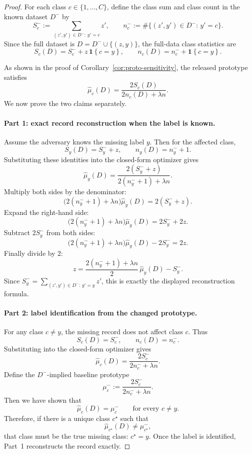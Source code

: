 \documentclass[conference,compsoc]{IEEEtran}
\newcommand{\ind}[1]{\mathbf{1}\!\left\{#1\right\}}
\begin{document}
\begin{proof}
For each class $c\in\{1,\dots,C\}$, define the class sum and class count in the known dataset $D^-$ by
\[
S_c^-:=\sum_{(z',y')\in D^-:\,y'=c} z',
\qquad
n_c^-:=\#\{(z',y')\in D^-:\,y'=c\}.
\]
Since the full dataset is $D=D^-\cup\{(z,y)\}$, the full-data class statistics are
\[
S_c(D)=S_c^-+z\,\ind{c=y},
\qquad
n_c(D)=n_c^-+\ind{c=y}.
\]

As shown in the proof of Corollary~\ref{cor:proto-sensitivity}, the released prototype satisfies
\[
\widehat\mu_c(D)=\frac{2S_c(D)}{2n_c(D)+\lambda n}.
\]
We now prove the two claims separately.

\paragraph{Part 1: exact record reconstruction when the label is known.}
Assume the adversary knows the missing label $y$. Then for the affected class,
\[
S_y(D)=S_y^-+z,
\qquad
n_y(D)=n_y^-+1.
\]
Substituting these identities into the closed-form optimizer gives
\[
\widehat\mu_y(D)=\frac{2(S_y^-+z)}{2(n_y^-+1)+\lambda n}.
\]
Multiply both sides by the denominator:
\[
\bigl(2(n_y^-+1)+\lambda n\bigr)\widehat\mu_y(D)=2(S_y^-+z).
\]
Expand the right-hand side:
\[
\bigl(2(n_y^-+1)+\lambda n\bigr)\widehat\mu_y(D)=2S_y^-+2z.
\]
Subtract $2S_y^-$ from both sides:
\[
\bigl(2(n_y^-+1)+\lambda n\bigr)\widehat\mu_y(D)-2S_y^-=2z.
\]
Finally divide by $2$:
\[
z=\frac{2(n_y^-+1)+\lambda n}{2}\,\widehat\mu_y(D)-S_y^-.
\]
Since $S_y^-=
\sum_{(z',y')\in D^-:\,y'=y} z'$, this is exactly the displayed reconstruction formula.

\paragraph{Part 2: label identification from the changed prototype.}
For any class $c\neq y$, the missing record does not affect class $c$. Thus
\[
S_c(D)=S_c^-,
\qquad
n_c(D)=n_c^-.
\]
Substituting into the closed-form optimizer gives
\[
\widehat\mu_c(D)=\frac{2S_c^-}{2n_c^-+\lambda n}.
\]
Define the $D^-$-implied baseline prototype
\[
\mu_c^-:=\frac{2S_c^-}{2n_c^-+\lambda n}.
\]
Then we have shown that
\[
\widehat\mu_c(D)=\mu_c^- \qquad \text{for every }c\neq y.
\]
Therefore, if there is a unique class $c^\star$ such that
\[
\widehat\mu_{c^\star}(D)\neq \mu_{c^\star}^-,
\]
that class must be the true missing class: $c^\star=y$. Once the label is identified, Part~1 reconstructs the record exactly.


\end{proof}
\end{document}
